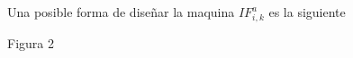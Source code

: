 \begin{frame}
  Una posible forma de dise\~{n}ar la maquina $IF_{i,k}^{a}$ es la siguiente

  \bigskip

  \bigskip

  \bigskip

  Figura 2\bigskip
\end{frame}
